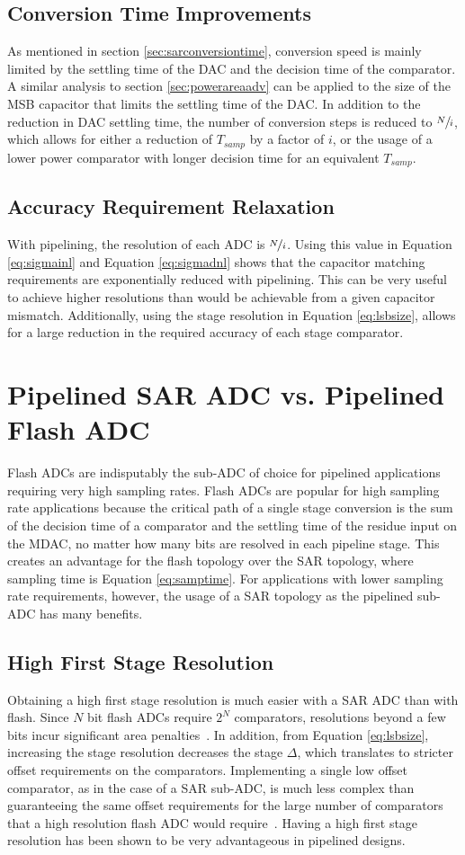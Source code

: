 \subsection{Conversion Time Improvements}
\label{sec:convtimeadv}
As mentioned in section \ref{sec:sarconversiontime}, conversion speed is mainly limited by the settling time of the DAC and the decision time of the comparator. A similar analysis to section \ref{sec:powerareaadv} can be 
applied to the size of the MSB capacitor that limits the settling time of the DAC. In addition to the reduction in DAC settling time, the number of conversion steps is reduced to $\sfrac{N}{i}$, which allows for either a 
reduction of $T_{samp}$ by a factor of $i$, or the usage of a lower power comparator with longer decision time for an equivalent $T_{samp}$. 
\subsection{Accuracy Requirement Relaxation}
With pipelining, the resolution of each ADC is $\nicefrac{N}{i}$. Using this value in Equation \ref{eq:sigmainl} and  Equation \ref{eq:sigmadnl} shows that the capacitor matching requirements are exponentially reduced with 
pipelining. This can be very useful to achieve higher resolutions than would be achievable from a given capacitor mismatch. Additionally, using the stage resolution in Equation \ref{eq:lsbsize}, allows for a large 
reduction in the required accuracy of each stage comparator.
\section{Pipelined SAR ADC vs. Pipelined Flash ADC}
Flash ADCs are indisputably the sub-ADC of choice for pipelined applications requiring very high sampling rates. Flash ADCs are popular for high sampling rate applications because the critical path of a single stage 
conversion is the sum of the decision time of a comparator and the settling time of the residue input on the MDAC, no matter how many bits are resolved in each pipeline stage. This creates an advantage for the flash topology 
over the SAR topology, where sampling time is Equation \ref{eq:samptime}. For applications with lower sampling rate requirements, however, the usage of a SAR topology as the pipelined sub-ADC has many benefits.
\subsection{High First Stage Resolution}
\label{sec:highfirstres}
Obtaining a high first stage resolution is much easier with a SAR ADC than with flash. Since $N$ bit flash ADCs require $2^N$ comparators, resolutions beyond a few bits incur significant area penalties~\cite{maximsaradc}. In 
addition, from Equation \ref{eq:lsbsize}, increasing the stage resolution decreases the stage $\Delta$, which translates to stricter offset requirements on the comparators. Implementing a single low offset comparator, as in 
the case of a SAR sub-ADC, is much less complex than guaranteeing the same offset requirements for the large number of comparators that a high resolution flash ADC would require~\cite{5714725}. Having a high first stage 
resolution has been shown to be very advantageous in pipelined designs.
